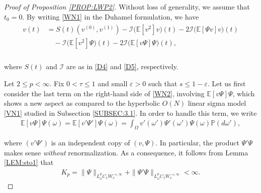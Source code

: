 \documentclass[letterpaper, 11pt,  reqno]{amsart}
\newcommand{\1}{\hspace{0.5mm}\text{I}\hspace{0.2mm}}
\newcommand{\noi}{\noindent}
\newcommand{\E}{\mathbb{E}}
\newcommand{\PP}{\mathbb{P}}
\newcommand{\eps}{\varepsilon}
\newcommand{\I}{\mathcal{I}}
\renewcommand{\O}{\Omega}
\renewcommand{\o}{\omega}
\numberwithin{equation}{section}
\numberwithin{theorem}{section}
\begin{document}
\begin{proof}[Proof of Proposition \ref{PROP:LWP2}] 
Without loss of generality, we assume that $t_0 = 0$.
By writing  \eqref{WN1} in the Duhamel formulation, 
we have 
\begin{align}
\begin{split}
v(t) 
& = S (t) (v^{(0)}, v^{(1)}) 
- \I \big(\E [ v^2 ] v\big)(t) 
- 2 \I \big(\E [ \Psi v ] v\big)(t)\\
& \quad 
 -  \I \big(\E [ v^2 ] \Psi \big)(t)
 - 2 \I \big(\E [ v \Psi] \Psi\big)(t),  \\
\end{split}
\label{WN2}
\end{align} 

\noi
where $S (t)$ and  $\mathcal{I}$
are as in \eqref{D4} and 
 \eqref{D5}, respectively.
 
 
 
Let $2 \le p < \infty$.
Fix $0 < \tau \le 1$
and small $\eps > 0$
such that $s \le 1-\eps$.
Let us first consider the last term on the right-hand side
of \eqref{WN2},
involving $\E [ v\Psi  ] \Psi$, 
which shows a new aspect as compared to
the hyperbolic $O(N)$ linear sigma model
\eqref{VN1} studied in Subsection \ref{SUBSEC:3.1}.
In order to handle this term, 
we 
write 
\begin{align}
    \E [v\Psi ] \Psi(\o) = \E [ v'\Psi'  ] \Psi(\o)
= \int_\O
v' (\o') \Psi' (\o') \Psi(\o)
 \PP(d\o')    , 
\label{WN3}
\end{align}

\noi
where  $(v' \Psi')$ is an independent copy of $(v, \Psi)$.
In particular, the product 
$\Psi' \Psi$ makes sense {\it without} renormalization.
As a consequence, it follows from Lemma \ref{LEM:sto1}
that 
\begin{align}
K_p =  \| \Psi  \|_{L^p_\o C_1 W_x^{-\eps, \infty}}
+ 
\|\Psi' \Psi  \|_{L^p_\o C_1 W_x^{-\eps, \infty}} < \infty.
\label{WN3a}
\end{align}









\end{proof}
\end{document}
